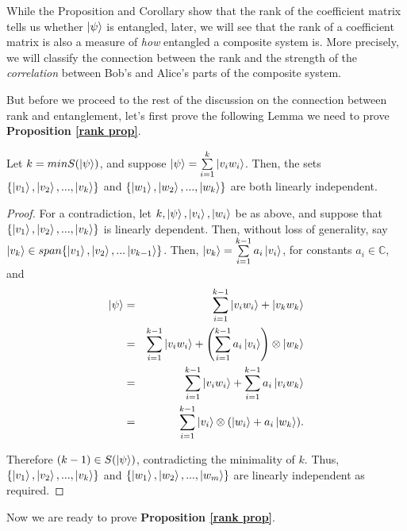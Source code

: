 While the Proposition and Corollary show that the rank of the coefficient matrix tells us whether $\ket{\psi}$ is entangled, later, we will see that the rank of a coefficient matrix is also a measure of {\emph{how}} entangled a composite system is. More precisely, we will classify the connection between the rank and the strength of the {\emph{correlation}} between Bob's and Alice's parts of the composite system.

But before we proceed to the rest of the discussion on the connection between rank and entanglement, let's first prove the following Lemma we need to prove \textbf{Proposition \ref{rank prop}}.

\begin{lemma}
\label{independence lemma}
Let $k=min S(\ket{\psi})$, and suppose $\ket{\psi}=\sum\limits_{i=1}^k \ket{v_iw_i}$.  Then, the sets $\{\ket{v_1}, \ket{v_2},...,\ket{v_k}\}$ and $\{\ket{w_1}, \ket{w_2},...,\ket{w_k}\}$ are both linearly independent.
\end{lemma}

\begin{proof}
For a contradiction, let $k, \ket{\psi}, \ket{v_i}, \ket{w_i}$ be as above, and suppose that $\{\ket{v_1}, \ket{v_2},...,\ket{v_k}\}$ is linearly dependent. Then, without loss of generality, say $\ket{v_k} \in span\{\ket{v_1}, \ket{v_2},...\ket{v_{k-1}}\}$. Then, $\ket{v_k}=\sum\limits_{i=1}^{k-1} a_i \ket{v_i}$, for constants $a_i \in \mathbb{C}$, and
\begin{eqnarray*}
\ket{\psi}&=&\sum\limits_{i=1}^{k-1} \ket{v_i w_i} + \ket{v_k w_k}\\
&=&\sum_{i=1}^{k-1} \ket{v_i w_i} + \left(\sum_{i=1}^{k-1} a_i\ket{v_i}\right) \otimes \ket{w_k}\\
&=&\sum_{i=1}^{k-1} \ket{v_i w_i} + \sum_{i=1}^{k-1} a_i\ket{v_iw_k}\\
&=&\sum_{i=1}^{k-1} \ket{v_i} \otimes (\ket{w_i}+a_i\ket{w_k}).\\
\end{eqnarray*}

Therefore $(k-1) \in S(\ket{\psi})$, contradicting the minimality of $k$.  Thus, $\{\ket{v_1}, \ket{v_2},...,\ket{v_k}\}$ and $\{\ket{w_1}, \ket{w_2},...,\ket{w_m}\}$ are linearly independent as required.
\end{proof}

\bigskip
Now we are ready to prove \textbf{Proposition \ref{rank prop}}.

